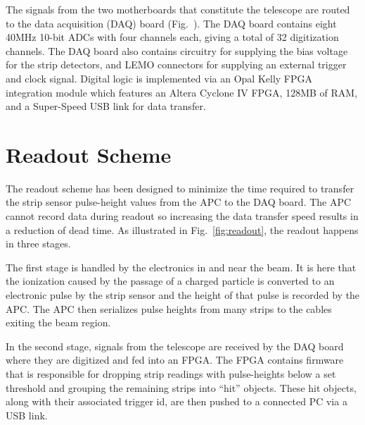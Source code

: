 \documentclass{PoS}
\begin{document}
The signals from the two motherboards that constitute the telescope are routed
to the data acquisition (DAQ) board (Fig.~). The DAQ board contains eight
40\si{\mega\hertz} 10-bit ADCs with four channels each, giving a total of 32
digitization channels. The DAQ board also contains circuitry for supplying the
bias voltage for the strip detectors, and LEMO connectors for supplying an
external trigger and clock signal. Digital logic is implemented via an Opal
Kelly FPGA integration module which features an Altera Cyclone IV FPGA, 128MB
of RAM, and a Super-Speed USB link for data transfer.

\section{Readout Scheme}
The readout scheme has been designed to minimize the time required to transfer
the strip sensor pulse-height values from the APC to the DAQ board.  The APC
cannot record data during readout so increasing the data transfer speed results
in a reduction of dead time.  As illustrated in Fig.~\ref{fig:readout}, the
readout happens in three stages.

The first stage is handled by the electronics
in and near the beam. It is here that the ionization caused by the passage of a
charged particle is converted to an electronic pulse by the strip sensor and
the height of that pulse is recorded by the APC. The APC then serializes pulse
heights from many strips to the cables exiting the beam region.

In the second stage, signals from the telescope are received by the DAQ
board where they are digitized and fed into an FPGA. The FPGA contains firmware
that is responsible for dropping strip readings with pulse-heights below a
set threshold and grouping the remaining strips into ``hit'' objects. These hit
objects, along with their associated trigger id, are then pushed to a connected
PC via a USB link.
\end{document}

